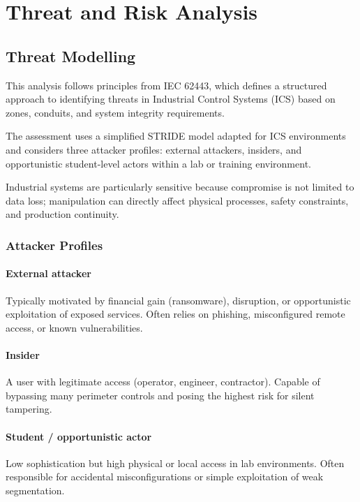 \section{Threat and Risk Analysis}

\subsection{Threat Modelling}

This analysis follows principles from IEC 62443, which defines a structured approach to identifying threats in Industrial Control Systems (ICS) based on zones, conduits, and system integrity requirements.

The assessment uses a simplified STRIDE model adapted for ICS environments and considers three attacker profiles: external attackers, insiders, and opportunistic student-level actors within a lab or training environment.

Industrial systems are particularly sensitive because compromise is not limited to data loss; manipulation can directly affect physical processes, safety constraints, and production continuity.

\subsubsection{Attacker Profiles}

\paragraph{External attacker}
Typically motivated by financial gain (ransomware), disruption, or opportunistic exploitation of exposed services. Often relies on phishing, misconfigured remote access, or known vulnerabilities.

\paragraph{Insider}
A user with legitimate access (operator, engineer, contractor). Capable of bypassing many perimeter controls and posing the highest risk for silent tampering.

\paragraph{Student / opportunistic actor}
Low sophistication but high physical or local access in lab environments. Often responsible for accidental misconfigurations or simple exploitation of weak segmentation.


